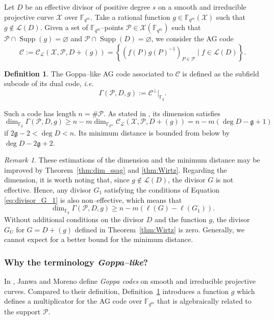 \documentclass[a4paper]{amsart}
\theoremstyle{definition}
\newtheorem{definition}[thm]{Definition}
\theoremstyle{remark}
\newtheorem{remark}[thm]{Remark}
\newcommand{\calP}{\mathcal{P}}
\newcommand{\calL}{\mathcal{L}}
\newcommand{\calC}{\mathcal{C}}
\newcommand{\calX}{\mathcal{X}}
\newcommand{\fqm}{\mathbb{F}_{q^m}}
\newcommand{\fq}{\mathbb{F}_{q}}
\newcommand{\set}[1]{\left\{#1\right\}}
\newcommand{\Supp}{\operatorname{Supp}}
\begin{document}
Let $D$ be an effective divisor of positive degree $s$ on a smooth and irreducible projective curve $\calX$ over $\fqm$. Take a rational function $g \in \fqm(\calX)$ such that $g \notin \calL(D)$. Given a set of $\fqm$--points $\calP \in \calX(\fqm)$ such that $\calP \cap \Supp(g) = \varnothing$ and $\calP \cap \Supp(D) = \varnothing$, we consider the AG code
\[\calC := \calC_{\calL}(\calX,\calP,D+(g))=\set{\left(f(P)g(P)^{-1}\right)_{P \in \calP} \mid f \in \calL(D)}.\]
\begin{definition} \label{def:Goppa--like_AG_code}
The Goppa--like AG code associated to $\calC$ is defined as the subfield subcode of its dual code, \emph{i.e.}
\[ \Gamma(\calP,D,g) := \calC^{\perp}|_{\fq}.\]
\end{definition}%
%
Such a code has length $n = \# \calP$. As stated in \cite[Theorem~1]{JM96}, its dimension satisfies 
\[\dim_{\fq} \Gamma(\calP,D,g) \geq n-m \dim_{\fqm} \calC_{\calL}(\calX,\calP,D+(g)) =n-m(\deg D - \mathfrak{g} +1 )\]
if $2\mathfrak{g} - 2 < \deg D < n$. Its minimum distance is bounded from below by $\deg D - 2 \mathfrak{g} + 2$.

\begin{remark}
These estimations of the dimension and the minimum distance may be improved by Theorem~\ref{thm:dim_ssag} and \ref{thm:Wirtz}. Regarding the dimension, it is worth noting that, since $g \notin \calL(D)$, the divisor $G$ is not effective. Hence, any divisor $G_1$ satisfying the conditions of Equation \eqref{eq:divisor_G_1} is also non--effective, which means that
\[	\dim_{\fq}  \Gamma(\calP,D,g) \geq 	n-m\left(\ell(G) - \ell(G_1)\right). \]
Without additional conditions on the divisor $D$ and the function $g$, the divisor $G_U$ for $G=D+(g)$ defined in Theorem~\ref{thm:Wirtz} is zero. Generally, we cannot expect for a better bound for the minimum distance. 
\end{remark}



\subsubsection{Why the terminology \textit{Goppa--like}?}

In \cite{JM96}, Janwa and Moreno define \emph{Goppa codes} on smooth and irreducible projective curves. Compared to their definition, Definition~\ref{def:Goppa--like_AG_code} introduces a function $g$ which defines a multiplicator for the AG code over $\fqm$ that is algebraically related to the support $\calP$.
\end{document}
